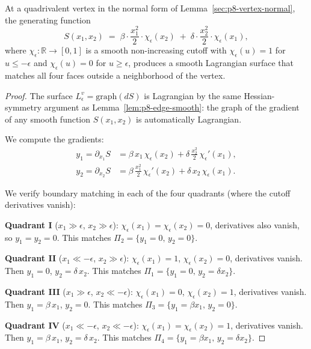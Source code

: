 \begin{lemma}
\label{lem:p8-vertex-smooth}
At a quadrivalent vertex in the normal form of Lemma~\ref{sec:p8-vertex-normal},
the generating function
\[
  S(x_1,x_2)
  \;=\;
  \beta\cdot\frac{x_1^2}{2}\cdot\chi_\epsilon(x_2)
  \;+\;
  \delta\cdot\frac{x_2^2}{2}\cdot\chi_\epsilon(x_1),
\]
where $\chi_\epsilon:\mathbb{R}\to[0,1]$ is a smooth non-increasing cutoff
with $\chi_\epsilon(u)=1$ for $u\le -\epsilon$ and $\chi_\epsilon(u)=0$ for
$u\ge\epsilon$, produces a smooth Lagrangian surface that matches all four
faces outside a neighborhood of the vertex.
\end{lemma}

\begin{proof}
The surface $L_\epsilon^v = \mathrm{graph}(dS)$ is Lagrangian by the same
Hessian-symmetry argument as Lemma~\ref{lem:p8-edge-smooth}: the graph of
the gradient of any smooth function $S(x_1,x_2)$ is automatically Lagrangian.

We compute the gradients:
\begin{align*}
  y_1 = \partial_{x_1}S
  &= \beta\, x_1\,\chi_\epsilon(x_2)
     + \delta\,\tfrac{x_2^2}{2}\,\chi_\epsilon'(x_1), \\
  y_2 = \partial_{x_2}S
  &= \beta\,\tfrac{x_1^2}{2}\,\chi_\epsilon'(x_2)
     + \delta\, x_2\,\chi_\epsilon(x_1).
\end{align*}

We verify boundary matching in each of the four quadrants (where the
cutoff derivatives vanish):

\textbf{Quadrant I} ($x_1\gg\epsilon$, $x_2\gg\epsilon$):
$\chi_\epsilon(x_1)=\chi_\epsilon(x_2)=0$, derivatives also vanish, so
$y_1=y_2=0$. This matches $\Pi_2=\{y_1=0,\,y_2=0\}$.

\textbf{Quadrant II} ($x_1\ll -\epsilon$, $x_2\gg\epsilon$):
$\chi_\epsilon(x_1)=1$, $\chi_\epsilon(x_2)=0$, derivatives vanish. Then
$y_1 = 0$, $y_2 = \delta\, x_2$. This matches
$\Pi_1 = \{y_1=0,\, y_2=\delta x_2\}$.

\textbf{Quadrant III} ($x_1\gg\epsilon$, $x_2\ll -\epsilon$):
$\chi_\epsilon(x_1)=0$, $\chi_\epsilon(x_2)=1$, derivatives vanish. Then
$y_1 = \beta\, x_1$, $y_2 = 0$. This matches
$\Pi_3=\{y_1=\beta x_1,\, y_2=0\}$.

\textbf{Quadrant IV} ($x_1\ll -\epsilon$, $x_2\ll -\epsilon$):
$\chi_\epsilon(x_1)=\chi_\epsilon(x_2)=1$, derivatives vanish. Then
$y_1 = \beta\, x_1$, $y_2 = \delta\, x_2$. This matches
$\Pi_4=\{y_1=\beta x_1,\, y_2=\delta x_2\}$.
\end{proof}

